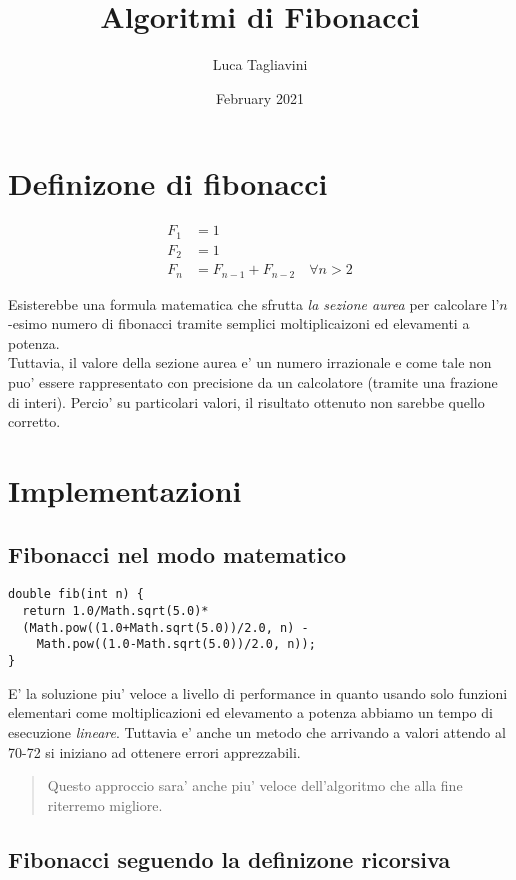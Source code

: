 \documentclass{article}
\title{\textbf{Algoritmi di Fibonacci}}
\author{Luca Tagliavini}
\date{February 2021}
\begin{document}
\maketitle
\tableofcontents
\pagebreak

\section{Definizone di fibonacci}

\begin{align*}
F_1 &= 1 \\
F_2 &= 1 \\
F_n &= F_{n-1} + F_{n-2} \quad \forall n > 2
\end{align*}

Esisterebbe una formula matematica che sfrutta \emph{la sezione aurea} per calcolare l'$n$-esimo numero di fibonacci tramite semplici moltiplicaizoni ed elevamenti a potenza. \\
Tuttavia, il valore della sezione aurea e' un numero irrazionale e come tale non puo' essere rappresentato con precisione da un calcolatore (tramite una frazione di interi).
Percio' su particolari valori, il risultato ottenuto non sarebbe quello corretto.

\section{Implementazioni}
\subsection{Fibonacci nel modo matematico}

\begin{lstlisting}
double fib(int n) {
  return 1.0/Math.sqrt(5.0)*
  (Math.pow((1.0+Math.sqrt(5.0))/2.0, n) - 
    Math.pow((1.0-Math.sqrt(5.0))/2.0, n));
}
\end{lstlisting}

E' la soluzione piu' veloce a livello di performance in quanto usando solo funzioni elementari come moltiplicazioni ed elevamento a potenza abbiamo un tempo di esecuzione \emph{lineare}.
Tuttavia e' anche un metodo che arrivando a valori attendo al 70-72 si iniziano ad ottenere errori apprezzabili.
\begin{quote}
  Questo approccio sara' anche piu' veloce dell'algoritmo che alla fine riterremo migliore.
\end{quote}

\subsection{Fibonacci seguendo la definizone ricorsiva}
\end{document}
